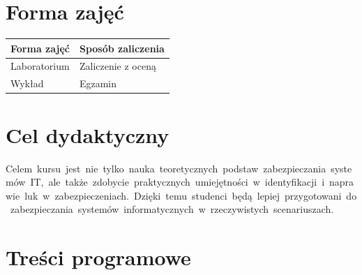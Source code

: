 \documentclass[12pt, a4paper]{article}
\begin{document}
\section{Forma zajęć}

\begin{tabular}{ll}
  \hline
  \textbf{Forma zajęć} & \textbf{Sposób zaliczenia} \\
  \hline
  Laboratorium & Zaliczenie z oceną \\
  Wykład & Egzamin \\
  \hline
\end{tabular}

\section{Cel dydaktyczny}

Celem kursu jest nie tylko nauka teoretycznych podstaw zabezpieczania systemów IT, ale także zdobycie praktycznych umiejętności w identyfikacji i naprawie luk w zabezpieczeniach. Dzięki temu studenci będą lepiej przygotowani do zabezpieczania systemów informatycznych w rzeczywistych scenariuszach.

\section{Treści programowe}
\end{document}
